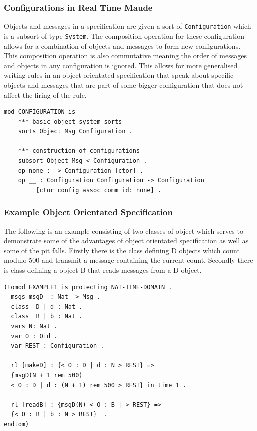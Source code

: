 \subsubsection*{Configurations in Real Time Maude}
Objects and messages in a specification are given a sort of \texttt{Configuration} which is a subsort of type \texttt{System}. The composition operation for these configuration allows for a combination of objects and messages to form new configurations. This composition operation is also commutative meaning the order of messages and objects in any configuration is ignored. This allows for more generalised writing rules in an object orientated specification that speak about specific objects and messages that are part of some bigger configuration that does not affect the firing of the rule.

\begin{verbatim}
mod CONFIGURATION is  
    *** basic object system sorts  
    sorts Object Msg Configuration .  
 
    *** construction of configurations  
    subsort Object Msg < Configuration .  
    op none : -> Configuration [ctor] .  
    op __ : Configuration Configuration -> Configuration  
         [ctor config assoc comm id: none] .
\end{verbatim}



\subsubsection*{Example Object Orientated Specification}
The following is an example consisting of two classes of object which serves to demonstrate some of the advantages of object orientated specification as well as some of the pit falls. Firstly there is the class defining D objects which count modulo 500 and transmit a message containing the current count. Secondly there is class defining a object B that reads messages from a D object. 

\begin{verbatim}
(tomod EXAMPLE1 is protecting NAT-TIME-DOMAIN .
  msgs msgD  : Nat -> Msg .  
  class  D | d : Nat .
  class  B | b : Nat .
  vars N: Nat .
  var O : Oid .
  var REST : Configuration .
 
  rl [makeD] : {< O : D | d : N > REST} => 
  {msgD(N + 1 rem 500)  
  < O : D | d : (N + 1) rem 500 > REST} in time 1 . 

  rl [readB] : {msgD(N) < O : B | > REST} => 
  {< O : B | b : N > REST}  . 
endtom)
\end{verbatim}


